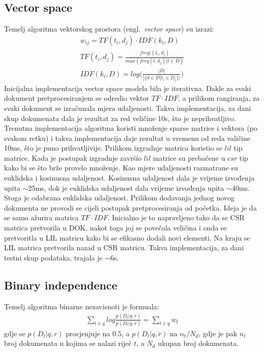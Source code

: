 \documentclass[a4paper,12pt]{article}
\newcommand{\engl}[1]{(engl.~\emph{#1})}
\begin{document}
\subsection{Vector space}

Temelj algoritma vektorskog prostora \engl{vector space} su izrazi:
\begin{align}
w_{ij} = TF(t_i , d_j) \cdot IDF(k_i , D) \\
TF(t_i , d_j) = \frac{freq((t_i , d_j)}{max(freq(t, d_j) | t \in D)} \\
IDF(k_i, D) = log\Big(\frac{|D|}{|\{d \in D | t_i \in D_j\}|}\Big)
\end{align}
Inicijalna implementacija vector space modela bila je iterativna. Dakle za svaki dokument pretprocesiranjem se odredio vektor $TF \cdot IDF$, a prilikom rangiranja, za svaki dokument se izračunala mjera udaljenosti. Takva implementacija, za dani skup dokumenata dala je rezultat za red veličine 10s, što je neprihvatljivo. Trenutna implementacija algoritma koristi množenje sparse matrice i vektora (po svakom retku) i takva implementacija daje rezultat u vremenu od reda valičine 10ms, što je puno prihvatljivije. Prilikom izgradnje matrica koristio se $lil$ tip matrice. Kada je postupak izgradnje završio $lil$ matrice su prebačene u $csr$ tip kako bi se što brže provelo množenje. Kao mjere udaljenosti razmatrane su euklidska i kosinusna udaljenost. Kosinusna udaljenost dala je vrijeme izvođenja upita $\sim$25ms, dok je euklidska udaljenost dala vrijeme izvođenja upita $\sim$40ms. Stoga je odabrana euklidska udaljenost. Prilikom dodavanja jednog novog dokumenta ne provodi se cijeli postupak pretprocesiranja od početka. Ideja je da se samo ažurira matrica $TF \cdot IDF$. Inicialno je to napravljeno tako da se CSR matrica pretvorila u DOK, nakot toga joj se povečala veličina i onda se pretvoritla u LIL matricu kako bi se efikasno dodali novi elementi. Na kraju se LIL matrica pretvorila nazad u CSR matricu. Takva implementacija, za dani testni skup podataka, trajala je $\sim$6s.

\subsection{Binary independence}

Temelj algoritma binarne nezavisnoti je formuala:
\begin{align}
\sum_{t \in q} log \frac{p(D_t|q, r)}{p(D_t|q, \bar r)} = \sum_{t \in q} w_t
\end{align}
gdje se $p(D_t|q, r)$ procjenjuje na $0.5$, a $p(D_t|q, \bar r)$ na $n_t / N_d$, gdje je pak $n_t$ broj dokumenata u kojima se nalazi riječ $t$, a $N_d$ ukupan broj dokumenata.
\end{document}
